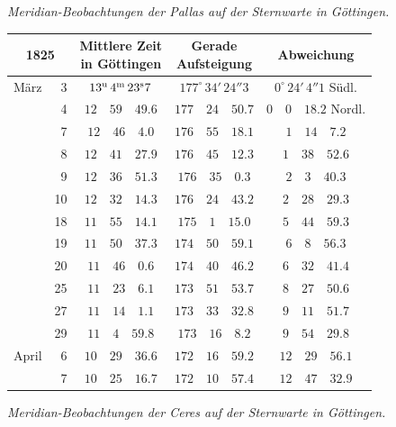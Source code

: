 \begin{center}
\emph{Meridian-Beobachtungen der Pallas auf der Sternwarte in Göttingen.}
\end{center}

\begin{center}
\begingroup\small\setlength{\tabcolsep}{4pt}
\begin{tabular}{lr|c|c|c}
\multicolumn{2}{c|}{1825} & \shortstack{Mittlere Zeit\\in Göttingen} & \shortstack{Gerade\\Aufsteigung} & Abweichung \\
\hline
März & 3 & $13^{\rm u}\,4^{\rm m}\,23^{\rm s}7$ & $177^{\circ}\,34'\,24''3$ & $0^{\circ}\,24'\,4''1$ Südl. \\
 & 4 & $12\quad59\quad49.6$ & $177\quad24\quad50.7$ & $0\quad0\quad18.2$ Nordl. \\
 & 7 & $12\quad46\quad4.0$ & $176\quad55\quad18.1$ & $1\quad14\quad7.2$ \\
 & 8 & $12\quad41\quad27.9$ & $176\quad45\quad12.3$ & $1\quad38\quad52.6$ \\
 & 9 & $12\quad36\quad51.3$ & $176\quad35\quad0.3$ & $2\quad3\quad40.3$ \\
 & 10 & $12\quad32\quad14.3$ & $176\quad24\quad43.2$ & $2\quad28\quad29.3$ \\
 & 18 & $11\quad55\quad14.1$ & $175\quad1\quad15.0$ & $5\quad44\quad59.3$ \\
 & 19 & $11\quad50\quad37.3$ & $174\quad50\quad59.1$ & $6\quad8\quad56.3$ \\
 & 20 & $11\quad46\quad0.6$ & $174\quad40\quad46.2$ & $6\quad32\quad41.4$ \\
 & 25 & $11\quad23\quad6.1$ & $173\quad51\quad53.7$ & $8\quad27\quad50.6$ \\
 & 27 & $11\quad14\quad1.1$ & $173\quad33\quad32.8$ & $9\quad11\quad51.7$ \\
 & 29 & $11\quad4\quad59.8$ & $173\quad16\quad8.2$ & $9\quad54\quad29.8$ \\
April & 6 & $10\quad29\quad36.6$ & $172\quad16\quad59.2$ & $12\quad29\quad56.1$ \\
 & 7 & $10\quad25\quad16.7$ & $172\quad10\quad57.4$ & $12\quad47\quad32.9$ \\
\end{tabular}
\endgroup
\end{center}

\begin{center}
\emph{Meridian-Beobachtungen der Ceres auf der Sternwarte in Göttingen.}
\end{center}

